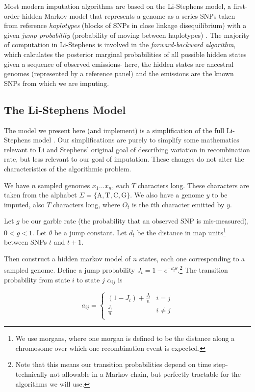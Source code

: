 \documentclass[12pt]{article}
\begin{document}
Most modern imputation algorithms are based on the Li-Stephens model, a first-order hidden Markov model that represents a genome as a series SNPs taken from reference \textit{haplotypes} (blocks of SNPs in close linkage disequilibrium) with a given \textit{jump probability} (probability of moving between haplotypes) \cite{listephens}. The majority of computation in Li-Stephens is involved in the \textit{forward-backward algorithm}, which calculates the posterior marginal probabilities of all possible hidden states given a sequence of observed emissions- here, the hidden states are ancestral genomes (represented by a reference panel) and the emissions are the known SNPs from which we are imputing.

\subsection{The Li-Stephens Model}

The model we present here (and implement) is a simplification of the full Li-Stephens model \cite{listephens}.  Our simplifications are purely to simplify some mathematics relevant to Li and Stephens' original goal of describing variation in recombination rate, but less relevant to our goal of imputation.  These changes do not alter the characteristics of the algorithmic problem.

We have $n$ sampled genomes $x_1 \ldots x_n$, each $T$ characters long.  These characters are taken from the alphabet $\Sigma = \{\text{A}, \text{T}, \text{C}, \text{G}\}$.  We also have a genome $y$ to be imputed, also $T$ characters long, where $O_t$ is the $t$th character emitted by $y$.  

Let $g$ be our garble rate (the probability that an observed SNP is mis-measured), $0 < g < 1$.  Let $\theta$ be a jump constant.  Let $d_t$ be the distance in map units\footnote{We use morgans, where one morgan is defined to be the distance along a chromosome over which one recombination event is expected.} between SNPs $t$ and $t+1$.

Then construct a hidden markov model of $n$ states, each one corresponding to a sampled genome.  Define a jump probability $J_t = 1 - e^{-d_t\theta}$.\footnote{Note that this means our transition probabilities depend on time step- technically not allowable in a Markov chain, but perfectly tractable for the algorithms we will use.}  The transition probability from state $i$ to state $j$ $\alpha_{ij}$ is

\[ a_{ij} = \begin{cases} 
      (1 - J_t) + \frac{J_t}{n} & i = j \\
      \frac{J_t}{n} & i \neq j \\
   \end{cases}
\]
\end{document}
